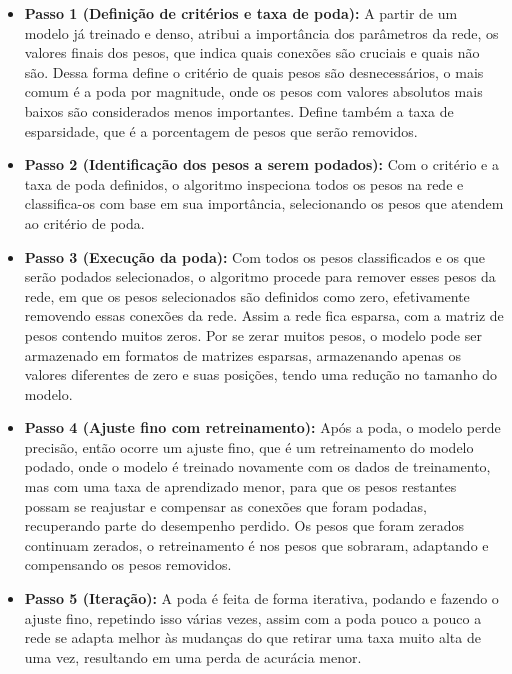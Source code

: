 \begin{itemize}
    \item \textbf{Passo 1 (Definição de critérios e taxa de poda):} A partir de um modelo já treinado e denso, atribui a importância dos parâmetros da rede, os valores finais dos pesos, que indica quais conexões são cruciais e quais não são. Dessa forma define o critério de quais pesos são desnecessários, o mais comum é a poda por magnitude, onde os pesos com valores absolutos mais baixos são considerados menos importantes. Define também a taxa de esparsidade, que é a porcentagem de pesos que serão removidos.
    \item \textbf{Passo 2 (Identificação dos pesos a serem podados):} Com o critério e a taxa de poda definidos, o algoritmo inspeciona todos os pesos na rede e classifica-os com base em sua importância, selecionando os pesos que atendem ao critério de poda.
    \item \textbf{Passo 3 (Execução da poda):} Com todos os pesos classificados e os que serão podados selecionados, o algoritmo procede para remover esses pesos da rede, em que os pesos selecionados são definidos como zero, efetivamente removendo essas conexões da rede. Assim a rede fica esparsa, com a matriz de pesos contendo muitos zeros. Por se zerar muitos pesos, o modelo pode ser armazenado em formatos de matrizes esparsas, armazenando apenas os valores diferentes de zero e suas posições, tendo uma redução no tamanho do modelo.
    \item \textbf{Passo 4 (Ajuste fino com retreinamento):} Após a poda, o modelo perde precisão, então ocorre um ajuste fino, que é um retreinamento do modelo podado, onde o modelo é treinado novamente com os dados de treinamento, mas com uma taxa de aprendizado menor, para que os pesos restantes possam se reajustar e compensar as conexões que foram podadas, recuperando parte do desempenho perdido. Os pesos que foram zerados continuam zerados, o retreinamento é nos pesos que sobraram, adaptando e compensando os pesos removidos.
    \item \textbf{Passo 5 (Iteração):} A poda é feita de forma iterativa, podando e fazendo o ajuste fino, repetindo isso várias vezes, assim com a poda pouco a pouco a rede se adapta melhor às mudanças do que retirar uma taxa muito alta de uma vez, resultando em uma perda de acurácia menor.
\end{itemize}


